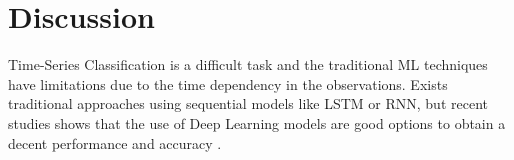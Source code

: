 \section{Discussion}
Time-Series Classification is a difficult task and the traditional ML techniques have limitations due to the time dependency in the observations. Exists traditional approaches using sequential models like LSTM or RNN, but recent studies shows that the use of Deep Learning models are good options to obtain a decent performance and accuracy \cite{Fawaz2019}. 
